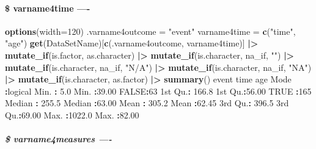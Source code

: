 \documentclass[
]{article}
\newenvironment{Shaded}{\begin{snugshade}}{\end{snugshade}}
\newcommand{\AttributeTok}[1]{\textcolor[rgb]{0.13,0.29,0.53}{#1}}
\newcommand{\ConstantTok}[1]{\textcolor[rgb]{0.56,0.35,0.01}{#1}}
\newcommand{\DecValTok}[1]{\textcolor[rgb]{0.00,0.00,0.81}{#1}}
\newcommand{\FloatTok}[1]{\textcolor[rgb]{0.00,0.00,0.81}{#1}}
\newcommand{\FunctionTok}[1]{\textcolor[rgb]{0.13,0.29,0.53}{\textbf{#1}}}
\newcommand{\NormalTok}[1]{#1}
\newcommand{\OtherTok}[1]{\textcolor[rgb]{0.56,0.35,0.01}{#1}}
\newcommand{\SpecialCharTok}[1]{\textcolor[rgb]{0.81,0.36,0.00}{\textbf{#1}}}
\newcommand{\StringTok}[1]{\textcolor[rgb]{0.31,0.60,0.02}{#1}}
\begin{document}
\hypertarget{varname4time--}{%
\paragraph{\$ varname4time ----}\label{varname4time--}}

\begin{Shaded}
\begin{Highlighting}[]
\FunctionTok{options}\NormalTok{(}\AttributeTok{width=}\DecValTok{120}\NormalTok{)}
\NormalTok{.varname4outcome }\OtherTok{=} \StringTok{"event"}
\NormalTok{varname4time }\OtherTok{=} \FunctionTok{c}\NormalTok{(}\StringTok{"time"}\NormalTok{, }\StringTok{"age"}\NormalTok{)}
\FunctionTok{get}\NormalTok{(DataSetName)[}\FunctionTok{c}\NormalTok{(.varname4outcome, varname4time)] }\SpecialCharTok{|\textgreater{}} 
    \FunctionTok{mutate\_if}\NormalTok{(is.factor, as.character) }\SpecialCharTok{|\textgreater{}}  
    \FunctionTok{mutate\_if}\NormalTok{(is.character, na\_if, }\StringTok{""}\NormalTok{) }\SpecialCharTok{|\textgreater{}} \FunctionTok{mutate\_if}\NormalTok{(is.character, na\_if, }\StringTok{"N/A"}\NormalTok{) }\SpecialCharTok{|\textgreater{}} \FunctionTok{mutate\_if}\NormalTok{(is.character, na\_if, }\StringTok{"NA"}\NormalTok{) }\SpecialCharTok{|\textgreater{}} 
    \FunctionTok{mutate\_if}\NormalTok{(is.character, as.factor) }\SpecialCharTok{|\textgreater{}} 
    \FunctionTok{summary}\NormalTok{()}
\NormalTok{   event              time             age       }
\NormalTok{ Mode }\SpecialCharTok{:}\NormalTok{logical   Min.   }\SpecialCharTok{:}   \FloatTok{5.0}\NormalTok{   Min.   }\SpecialCharTok{:}\FloatTok{39.00}  
 \ConstantTok{FALSE}\SpecialCharTok{:}\DecValTok{63}\NormalTok{        1st Qu.}\SpecialCharTok{:} \FloatTok{166.8}\NormalTok{   1st Qu.}\SpecialCharTok{:}\FloatTok{56.00}  
 \ConstantTok{TRUE} \SpecialCharTok{:}\DecValTok{165}\NormalTok{       Median }\SpecialCharTok{:} \FloatTok{255.5}\NormalTok{   Median }\SpecialCharTok{:}\FloatTok{63.00}  
\NormalTok{                 Mean   }\SpecialCharTok{:} \FloatTok{305.2}\NormalTok{   Mean   }\SpecialCharTok{:}\FloatTok{62.45}  
\NormalTok{                 3rd Qu.}\SpecialCharTok{:} \FloatTok{396.5}\NormalTok{   3rd Qu.}\SpecialCharTok{:}\FloatTok{69.00}  
\NormalTok{                 Max.   }\SpecialCharTok{:}\FloatTok{1022.0}\NormalTok{   Max.   }\SpecialCharTok{:}\FloatTok{82.00}  
\end{Highlighting}
\end{Shaded}

\hypertarget{varname4measures--}{%
\subparagraph{\$ varname4measures ----}\label{varname4measures--}}
\end{document}
